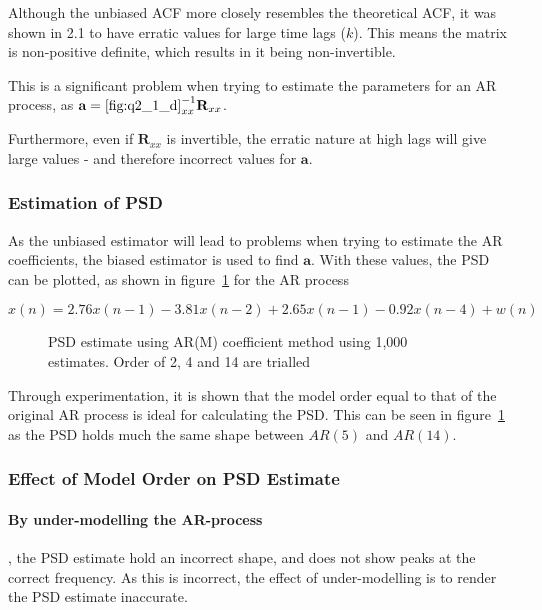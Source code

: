 \documentclass[main.tex]{subfiles}
\begin{document}
Although the unbiased ACF more closely resembles the theoretical ACF, it was shown in 2.1 to have erratic values for large time lags ($k$). This means the matrix is non-positive definite, which results in it being non-invertible. 

This is a significant problem when trying to estimate the parameters for an AR process, as $\textbf{a} = \ref{fig:q2_1_d}_{xx}^{-1}\textbf{R}_{xx}$.

Furthermore, even if $\textbf{R}_{xx}$ is invertible, the erratic nature at high lags will give large values - and therefore incorrect values for $\textbf{a}$.

\subsubsection{Estimation of PSD}

As the unbiased estimator will lead to problems when trying to estimate the AR coefficients, the biased estimator is used to find $\textbf{a}$. With these values, the PSD can be plotted, as shown in figure~\ref{fig:q2_3_b} for the AR process

\[
x(n) = 2.76x(n-1) - 3.81x(n-2) +2.65x(n-1) -0.92x(n-4) + w(n)
\]

\begin{figure}[H]
	\centering 
	\resizebox{\textwidth}{!}{}
	\caption{PSD estimate using AR(M) coefficient method using 1,000 estimates. Order of 2, 4 and 14 are trialled}
	\label{fig:q2_3_b}
\end{figure}

Through experimentation, it is shown that the model order equal to that of the original AR process is ideal for calculating the PSD. This can be seen in figure~\ref{fig:q2_3_b} as the PSD holds much the same shape between $AR(5)$ and $AR(14)$. 




\subsubsection{Effect of Model Order on PSD Estimate}

\paragraph{By under-modelling the AR-process}, the PSD estimate hold an incorrect shape, and does not show peaks at the correct frequency. As this is incorrect, the effect of under-modelling is to render the PSD estimate inaccurate.
\end{document}
